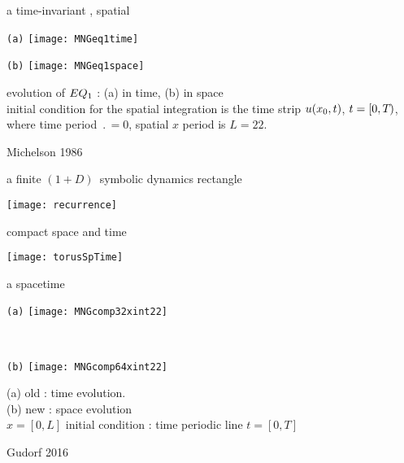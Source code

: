 \begin{frame}{a time-invariant \eqv, spatial \po}
\begin{center}
  \begin{minipage}[height=.45\textheight]{.45\textwidth}
    \centering \small{\texttt{(a)}}
    \texttt{[image: MNGeq1time]}
  \end{minipage}
  \begin{minipage}[height=.45\textheight]{.45\textwidth}
    \centering \small{\texttt{(b)}}
    \texttt{[image: MNGeq1space]}
  \end{minipage}
\end{center}
  evolution of $EQ_{1}$ : (a) in time, (b) in space
   \\
   initial condition for the spatial integration is the time strip
   $u(x_0,t)$, $t = [0,{T_{}})$, where time period
   $\period{} =0$, spatial $x$ period is $L=22$.

\vfill\hfill        Michelson 1986
\end{frame}


\begin{frame}{ %
a finite $(1+D)$\dmn\ symbolic dynamics rectangle
            }

\begin{center}
\texttt{[image: recurrence]}
\end{center}
\hfill \color{red}{make it doubly periodic}
\end{frame}

\begin{frame}{compact space and time} %
\begin{center}
\texttt{[image: torusSpTime]}
\end{center}
\end{frame}

\begin{frame}{a spacetime {\twot}
}
\begin{center}
  \begin{minipage}[height=.40\textheight]{.35\textwidth}
    \centering \small{\texttt{(a)}}
    \texttt{[image: MNGcomp32xint22]}
  \end{minipage}
~~~~~~~~~
  \begin{minipage}[height=.40\textheight]{.35\textwidth}
    \centering \small{\texttt{(b)}}
    \texttt{[image: MNGcomp64xint22]}
  \end{minipage}
\end{center}
    (a) old : time evolution.
\\
    (b) new : space evolution
    \\
    $x=[0,L]$ %
       initial condition : time periodic line $t = [0,T]$

\vfill\hfill        Gudorf 2016
\end{frame}


